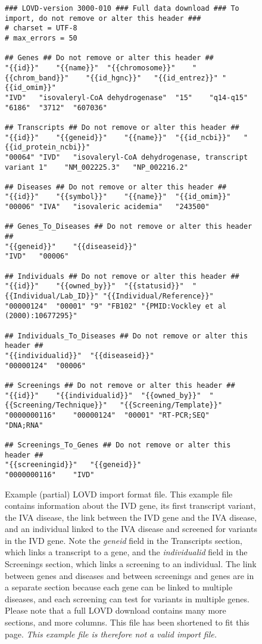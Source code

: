 \begin{figure}[ht]
  \begin{shaded}
    \scriptsize
    \begin{verbatim}
### LOVD-version 3000-010 ### Full data download ### To import, do not remove or alter this header ###
# charset = UTF-8
# max_errors = 50

## Genes ## Do not remove or alter this header ##
"{{id}}"	"{{name}}"	"{{chromosome}}"	"{{chrom_band}}"	"{{id_hgnc}}"	"{{id_entrez}}"	"{{id_omim}}"
"IVD"	"isovaleryl-CoA dehydrogenase"	"15"	"q14-q15"	"6186"	"3712"	"607036"

## Transcripts ## Do not remove or alter this header ##
"{{id}}"	"{{geneid}}"	"{{name}}"	"{{id_ncbi}}"	"{{id_protein_ncbi}}"
"00064"	"IVD"	"isovaleryl-CoA dehydrogenase, transcript variant 1"	"NM_002225.3"	"NP_002216.2"

## Diseases ## Do not remove or alter this header ##
"{{id}}"	"{{symbol}}"	"{{name}}"	"{{id_omim}}"
"00006"	"IVA"	"isovaleric acidemia"	"243500"

## Genes_To_Diseases ## Do not remove or alter this header ##
"{{geneid}}"	"{{diseaseid}}"
"IVD"	"00006"

## Individuals ## Do not remove or alter this header ##
"{{id}}"	"{{owned_by}}"	"{{statusid}}"	"{{Individual/Lab_ID}}"	"{{Individual/Reference}}"
"00000124"	"00001"	"9"	"FB102"	"{PMID:Vockley et al (2000):10677295}"

## Individuals_To_Diseases ## Do not remove or alter this header ##
"{{individualid}}"	"{{diseaseid}}"
"00000124"	"00006"

## Screenings ## Do not remove or alter this header ##
"{{id}}"	"{{individualid}}"	"{{owned_by}}"	"{{Screening/Technique}}"	"{{Screening/Template}}"
"0000000116"	"00000124"	"00001"	"RT-PCR;SEQ"	"DNA;RNA"

## Screenings_To_Genes ## Do not remove or alter this header ##
"{{screeningid}}"	"{{geneid}}"
"0000000116"	"IVD"
    \end{verbatim}
  \caption{%
    Example (partial) LOVD import format file.
    This example file contains information about the IVD gene, its first transcript variant,
     the IVA disease, the link between the IVD gene and the IVA disease, and an individual linked
     to the IVA disease and screened for variants in the IVD gene.
    Note the \emph{geneid} field in the Transcripts section, which links a transcript to a gene,
     and the \emph{individualid} field in the Screenings section, which links a screening to an individual.
    The link between genes and diseases and between screenings and genes are in a separate section because
     each gene can be linked to multiple diseases, and each screening can test for variants in multiple genes.
    Please note that a full LOVD download contains many more sections, and more columns.
    This file has been shortened to fit this page.
    \emph{This example file is therefore not a valid import file.}}
    \label{fig:example_import_format}
  \end{shaded}
\end{figure}

